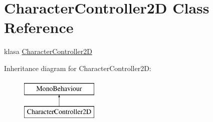 \hypertarget{class_character_controller2_d}{}\section{Character\+Controller2\+D Class Reference}
\label{class_character_controller2_d}


klasa \hyperlink{class_character_controller2_d}{Character\+Controller2\+D}  


Inheritance diagram for Character\+Controller2\+D\+:\begin{figure}[H]
\begin{center}
\leavevmode
\includegraphics[height=2.000000cm]{class_character_controller2_d}
\end{center}
\end{figure}
